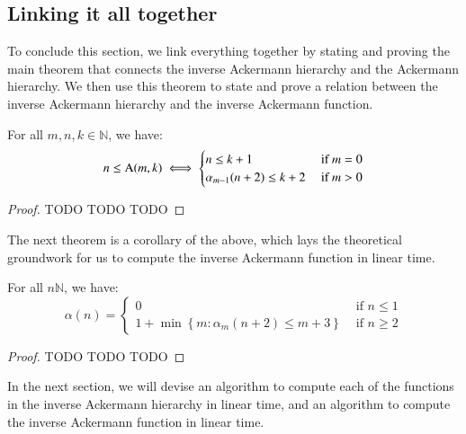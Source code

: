 \subsection{Linking it all together}

To conclude this section, we link everything together by 
stating and proving the main theorem that connects the 
inverse Ackermann hierarchy and the Ackermann hierarchy. 
We then use this theorem to state and prove a relation 
between the inverse Ackermann hierarchy and the inverse 
Ackermann function.

\begin{thm}  \label{thm: inv_ack_ack}
For all $m, n, k \in \mathbb{N}$, we have:
\begin{equation}
n \le \text{A}(m, k) \iff \begin{cases}
n \le k + 1 & \text{ if } m = 0 \\ \alpha_{m-1}(n+2) \le k + 2 & \text{ if } m > 0
\end{cases}
\end{equation}
\end{thm}


\begin{proof}
TODO TODO TODO
\end{proof}

The next theorem is a corollary of the above, which lays the 
theoretical groundwork for us to compute the inverse Ackermann 
function in linear time.

\begin{thm}
For all $n\mathbb{N}$, we have:
\begin{equation}
\alpha(n) = \begin{cases}
0 & \text{ if } n \le 1 \\
1 + \min\left\{ m: \alpha_m(n+2) \le m + 3 \right\} & \text{ if } n \ge 2
\end{cases}
\end{equation}
\end{thm}

\begin{proof}
TODO TODO TODO
\end{proof}

In the next section, we will devise an algorithm to compute each 
of the functions in the inverse Ackermann hierarchy in linear time, 
and an algorithm to compute the inverse Ackermann function in linear time.